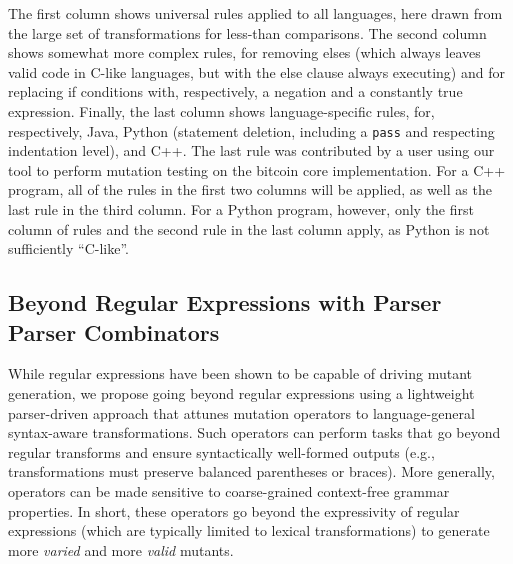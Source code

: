 \documentclass[sigconf,review, anonymous]{acmart}
\begin{document}
{The first column shows universal rules applied to
all languages, here drawn from the large set of transformations for
less-than comparisons.  The second column shows somewhat more
complex rules, for removing elses (which always leaves valid code in
C-like languages, but with the else clause always executing) and for
replacing if conditions with, respectively, a negation and a
constantly true expression.  Finally, the last column shows
language-specific rules, for, respectively, Java, Python (statement
deletion, including a {\tt pass} and respecting indentation level),
and C++.  The last rule was contributed by a user using our tool to
perform mutation testing on the bitcoin core implementation.  For a
C++ program, all of the rules in the first two columns will be
applied, as well as the last rule in the third column.  For a Python
program, however, only the first column of rules and the second rule
in the last column apply, as Python is not sufficiently ``C-like''.


\subsection{Beyond Regular Expressions with Parser Parser Combinators}




While regular expressions have been shown to be capable of driving mutant generation, we
propose going beyond regular expressions using a lightweight
parser-driven approach that attunes mutation operators to
language-general syntax-aware transformations. Such operators can
perform tasks that go beyond regular transforms and ensure
syntactically well-formed outputs (e.g., transformations must preserve
balanced parentheses or braces). More generally, operators can be made
sensitive to coarse-grained context-free grammar properties. In short,
these
operators go beyond the expressivity of regular expressions (which are
typically limited to lexical transformations) to generate more
\emph{varied} and more \emph{valid} mutants.

}
\end{document}
